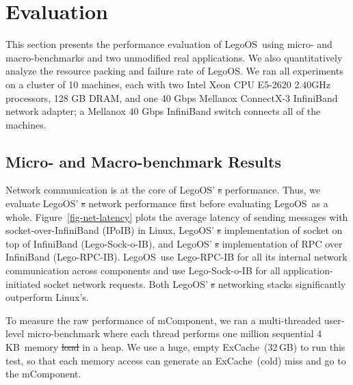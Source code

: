 \documentclass[10pt,times,twocolumn]{z2-article}
\newcommand{\KB}{\,KB}
\newcommand{\GB}{\,GB}
\newcommand{\lego}{LegoOS}
\newcommand{\excache}{ExCache}
\newcommand{\mcomponent}{mComponent}
\providecommand{\DIFaddtex}[1]{{\protect\color{blue}\uwave{#1}}} %
\providecommand{\DIFdeltex}[1]{{\protect\color{red}\sout{#1}}}                      %
\providecommand{\DIFaddbegin}{} %
\providecommand{\DIFaddend}{} %
\providecommand{\DIFdelbegin}{} %
\providecommand{\DIFdelend}{} %
\providecommand{\DIFadd}[1]{\texorpdfstring{\DIFaddtex{#1}}{#1}} %
\providecommand{\DIFdel}[1]{\texorpdfstring{\DIFdeltex{#1}}{}} %
\newcommand{\DIFscaledelfig}{0.5}
\newlength{\DIFdelgraphicswidth} %
\newlength{\DIFdelgraphicsheight} %
\newcommand{\DIFaddincludegraphics}[2][]{{\color{blue}\fbox{\DIFOincludegraphics[#1]{#2}}}} %
\newcommand{\DIFdelincludegraphics}[2][]{%
\sbox{\DIFdelgraphicsbox}{\DIFOincludegraphics[#1]{#2}}%
\settoboxwidth{\DIFdelgraphicswidth}{\DIFdelgraphicsbox} %
\settoboxtotalheight{\DIFdelgraphicsheight}{\DIFdelgraphicsbox} %
\scalebox{\DIFscaledelfig}{%
\parbox[b]{\DIFdelgraphicswidth}{\usebox{\DIFdelgraphicsbox}\\[-\baselineskip] \rule{\DIFdelgraphicswidth}{0em}}\llap{\resizebox{\DIFdelgraphicswidth}{\DIFdelgraphicsheight}{%
\setlength{\unitlength}{\DIFdelgraphicswidth}%
\begin{picture}(1,1)%
\thicklines\linethickness{2pt} %
{\color[rgb]{1,0,0}\put(0,0){\framebox(1,1){}}}%
{\color[rgb]{1,0,0}\put(0,0){\line( 1,1){1}}}%
{\color[rgb]{1,0,0}\put(0,1){\line(1,-1){1}}}%
\end{picture}%
}\hspace*{3pt}}} %
} %
\DeclareRobustCommand{\DIFaddbegin}{\DIFOaddbegin \let\includegraphics\DIFaddincludegraphics} %
\DeclareRobustCommand{\DIFaddend}{\DIFOaddend \let\includegraphics\DIFOincludegraphics} %
\DeclareRobustCommand{\DIFdelbegin}{\DIFOdelbegin \let\includegraphics\DIFdelincludegraphics} %
\DeclareRobustCommand{\DIFdelend}{\DIFOaddend \let\includegraphics\DIFOincludegraphics} %
\begin{document}
{{{{{{{%
\DIFdelend \section{Evaluation}
\label{sec:results}

This section presents the performance evaluation of \lego\ using micro- and macro-benchmarks and two unmodified real applications.
We also quantitatively analyze the resource packing and failure rate of \lego.
We ran all experiments on a cluster of 10 machines, each with two Intel Xeon CPU E5-2620 2.40GHz
processors, 128 GB DRAM, and one 40 Gbps Mellanox ConnectX-3 InfiniBand network adapter;
a Mellanox 40 Gbps InfiniBand switch connects all of the machines. 

\subsection{Micro- and Macro-benchmark Results}
Network communication is at the core of \lego' \DIFdelbegin \DIFdel{s }\DIFdelend performance.
Thus, we evaluate \lego' \DIFdelbegin \DIFdel{s }\DIFdelend network performance first before evaluating \lego\ as a whole.
Figure~\ref{fig-net-latency} plots the average latency of sending messages with socket-over-InfiniBand (IPoIB) in Linux,
\lego' \DIFdelbegin \DIFdel{s }\DIFdelend implementation of socket on top of InfiniBand (Lego-Sock-o-IB), and \lego' \DIFdelbegin \DIFdel{s }\DIFdelend implementation of RPC over InfiniBand (Lego-RPC-IB).
\lego\ use Lego-RPC-IB for all its internal network communication across components and use Lego-Sock-o-IB for 
all application-initiated socket network requests.
Both \lego' \DIFdelbegin \DIFdel{s }\DIFdelend networking stacks significantly outperform Linux's.

To measure the raw performance of \mcomponent, we ran a multi-threaded user-level micro-benchmark 
where each thread performs one million sequential 4\KB\ memory \DIFdelbegin \DIFdel{load }\DIFdelend \DIFaddbegin \DIFadd{loads }\DIFaddend in a heap.
We use a huge, empty \excache\ (32\GB) to run this test, 
so that each memory access can generate an \excache\ (cold) miss and go to the \mcomponent.
\DIFaddbegin 

}}}}}}}
\end{document}
